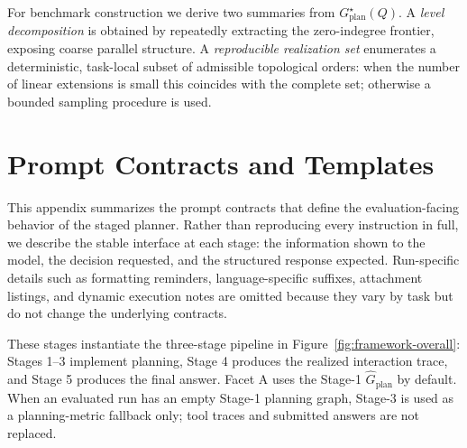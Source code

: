 \documentclass{article}
\begin{document}
For benchmark construction we derive two summaries from
$G_{\text{plan}}^\star(Q)$. A \emph{level decomposition} is obtained by
repeatedly extracting the zero-indegree frontier, exposing coarse parallel
structure. A \emph{reproducible realization set} enumerates a deterministic,
task-local subset of admissible topological orders: when the number of linear
extensions is small this coincides with the complete set; otherwise a bounded
sampling procedure is used.


\section{Prompt Contracts and Templates}
\label{sec:appendix-prompts}

This appendix summarizes the prompt contracts that define the
evaluation-facing behavior of the staged planner. Rather than reproducing every
instruction in full, we describe the stable interface at each stage: the
information shown to the model, the decision requested, and the structured
response expected. Run-specific details such as formatting reminders,
language-specific suffixes, attachment listings, and dynamic execution notes are
omitted because they vary by task but do not change the underlying contracts.

These stages instantiate the three-stage pipeline in
Figure~\ref{fig:framework-overall}: Stages 1--3 implement planning, Stage 4
produces the realized interaction trace, and Stage 5 produces the final answer.
Facet A uses the Stage-1 $\widehat{G}_{\text{plan}}$ by default. When an
evaluated run has an empty Stage-1 planning graph, Stage-3 is used as a
planning-metric fallback only; tool traces and submitted answers are not
replaced.
\end{document}
